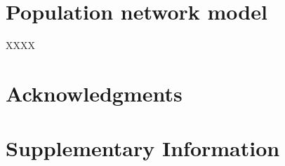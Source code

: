 \documentclass[10pt,a4paper,draft]{article}
\begin{document}
%

\section*{Population network model}
XXXX


\section*{Acknowledgments}
%







\newpage
\section*{Supplementary Information}
\appendix
\end{document}
